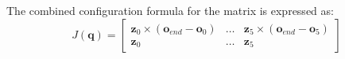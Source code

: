 \documentclass[11pt]{article}
\begin{document}
The combined configuration formula for the matrix is expressed as:
\begin{equation}
  \boxed{\;
  J(\mathbf{q}) = \begin{bmatrix} 
    \mathbf{z}_0 \times (\mathbf{o}_{end} - \mathbf{o}_0) & \dots & \mathbf{z}_5 \times (\mathbf{o}_{end} - \mathbf{o}_5) \\
    \mathbf{z}_0 & \dots & \mathbf{z}_5
  \end{bmatrix}
  \;}
\end{equation}
\end{document}
